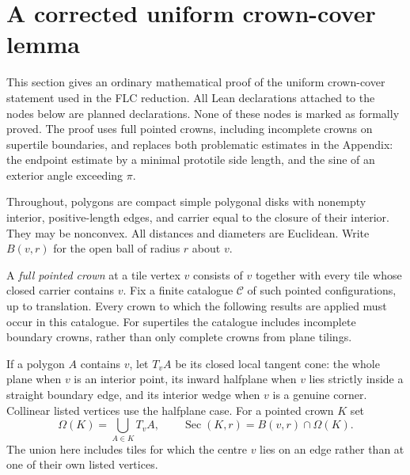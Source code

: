 \section{A corrected uniform crown-cover lemma}
\label{sec:corrected-crowns}

This section gives an ordinary mathematical proof of the uniform
crown-cover statement used in the FLC reduction.  All Lean declarations
attached to the nodes below are planned declarations.  None of these nodes
is marked as formally proved.  The proof uses full pointed crowns, including
incomplete crowns on supertile boundaries, and replaces both problematic
estimates in the Appendix: the endpoint estimate by a minimal prototile side
length, and the sine of an exterior angle exceeding $\pi$.

Throughout, polygons are compact simple polygonal disks with nonempty
interior, positive-length edges, and carrier equal to the closure of their
interior.  They may be nonconvex.  All distances and diameters are Euclidean.
Write $B(v,r)$ for the open ball of radius $r$ about $v$.

\begin{definition}
\label{def:crown-sector}
A \emph{full pointed crown} at a tile vertex $v$ consists of $v$ together
with every tile whose closed carrier contains $v$.  Fix a finite catalogue
$\mathcal C$ of such pointed configurations, up to translation.  Every crown
to which the following results are applied must occur in this catalogue.
For supertiles the catalogue includes incomplete boundary crowns, rather
than only complete crowns from plane tilings.

If a polygon $A$ contains $v$, let $T_vA$ be its closed local tangent cone:
the whole plane when $v$ is an interior point, its inward halfplane when
$v$ lies strictly inside a straight boundary edge, and its interior wedge
when $v$ is a genuine corner.  Collinear listed vertices use the halfplane
case.  For a pointed crown $K$ set
\[
  \Omega(K)=\bigcup_{A\in K}T_vA,
  \qquad \operatorname{Sec}(K,r)=B(v,r)\cap\Omega(K).
\]
The union here includes tiles for which the centre $v$ lies on an edge
rather than at one of their own listed vertices.
\end{definition}

